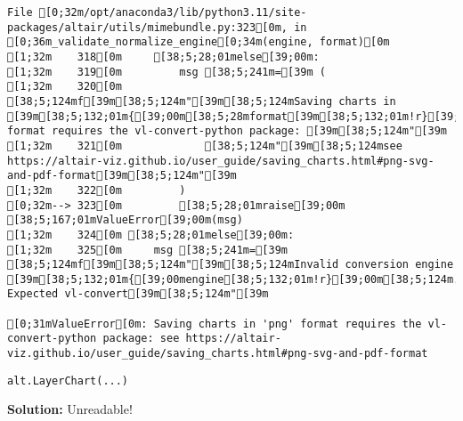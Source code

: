 \documentclass[
  letterpaper,
  DIV=11,
  numbers=noendperiod]{scrartcl}
\begin{document}
\begin{verbatim}
File [0;32m/opt/anaconda3/lib/python3.11/site-packages/altair/utils/mimebundle.py:323[0m, in [0;36m_validate_normalize_engine[0;34m(engine, format)[0m
[1;32m    318[0m     [38;5;28;01melse[39;00m:
[1;32m    319[0m         msg [38;5;241m=[39m (
[1;32m    320[0m             [38;5;124mf[39m[38;5;124m"[39m[38;5;124mSaving charts in [39m[38;5;132;01m{[39;00m[38;5;28mformat[39m[38;5;132;01m!r}[39;00m[38;5;124m format requires the vl-convert-python package: [39m[38;5;124m"[39m
[1;32m    321[0m             [38;5;124m"[39m[38;5;124msee https://altair-viz.github.io/user_guide/saving_charts.html#png-svg-and-pdf-format[39m[38;5;124m"[39m
[1;32m    322[0m         )
[0;32m--> 323[0m         [38;5;28;01mraise[39;00m [38;5;167;01mValueError[39;00m(msg)
[1;32m    324[0m [38;5;28;01melse[39;00m:
[1;32m    325[0m     msg [38;5;241m=[39m [38;5;124mf[39m[38;5;124m"[39m[38;5;124mInvalid conversion engine [39m[38;5;132;01m{[39;00mengine[38;5;132;01m!r}[39;00m[38;5;124m. Expected vl-convert[39m[38;5;124m"[39m

[0;31mValueError[0m: Saving charts in 'png' format requires the vl-convert-python package: see https://altair-viz.github.io/user_guide/saving_charts.html#png-svg-and-pdf-format
\end{verbatim}

\begin{verbatim}
alt.LayerChart(...)
\end{verbatim}

\textbf{Solution:} Unreadable!
\end{document}
